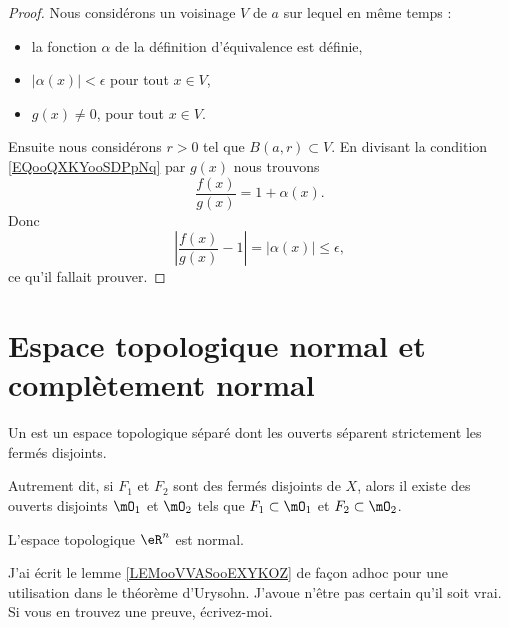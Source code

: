 \begin{proof}
	Nous considérons un voisinage \( V\) de \( a\) sur lequel en même temps :
	\begin{itemize}
		\item
		      la fonction \( \alpha\) de la définition d'équivalence est définie,
		\item
		      \( | \alpha(x) |<\epsilon\) pour tout \( x\in V\),
		\item
		      \( g(x)\neq 0\), pour tout \( x\in V\).
	\end{itemize}
	Ensuite nous considérons \( r>0\) tel que \( B(a,r)\subset V\). En divisant la condition \eqref{EQooQXKYooSDPpNq} par \( g(x)\) nous trouvons
	\begin{equation}
		\frac{ f(x) }{ g(x) }=1+\alpha(x).
	\end{equation}
	Donc
	\begin{equation}
		| \frac{ f(x) }{ g(x) }-1 |=| \alpha(x) |\leq \epsilon,
	\end{equation}
	ce qu'il fallait prouver.
\end{proof}


\section{Espace topologique normal et complètement normal}


\begin{definition}      \label{DEFooNNKVooLtzImT}
	Un  est un espace topologique séparé dont les ouverts séparent strictement les fermés disjoints.

	Autrement dit, si \( F_1\) et \( F_2\) sont des fermés disjoints de \( X\), alors il existe des ouverts disjoints \( \mO_1\) et \( \mO_2\) tels que  \( F_1\subset\mO_1\) et \( F_2\subset \mO_2\).
\end{definition}

\begin{proposition}     \label{PROPooWSKZooHKvuob}
	L'espace topologique \( \eR^n\) est normal.
\end{proposition}

\begin{probleme}
	J'ai écrit le lemme \ref{LEMooVVASooEXYKOZ} de façon adhoc pour une utilisation dans le théorème d'Urysohn. J'avoue n'être pas certain qu'il soit vrai. Si vous en trouvez une preuve, écrivez-moi.
\end{probleme}

